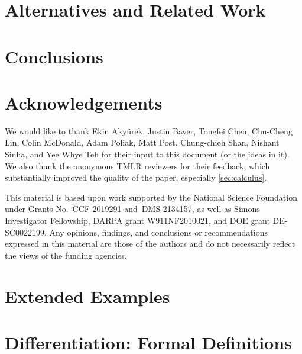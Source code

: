\documentclass[10pt]{article}
\theoremstyle{definition}
\begin{document}
\section{Alternatives and Related Work}


\section{Conclusions}


\section*{Acknowledgements}

We would like to thank Ekin Aky\"{u}rek, Justin Bayer, Tongfei Chen, Chu-Cheng Lin, Colin McDonald, Adam Poliak, Matt Post, Chung-chieh Shan, Nishant Sinha, and Yee Whye Teh for their input to this document (or the ideas in it). We also thank the anonymous TMLR reviewers for their feedback, which substantially improved the quality of the paper, especially \cref{sec:calculus}.

This material is based upon work supported by the National Science Foundation under Grants No.~CCF-2019291 and~DMS-2134157, as well as Simons Investigator Fellowship, DARPA grant W911NF2010021, and DOE grant DE-SC0022199. 
Any opinions, findings, and conclusions or recommendations expressed in this material are those of the authors and do not necessarily reflect the views of the funding agencies.




\appendix

\section{Extended Examples}
\label{sec:examples_long}


\section{Differentiation: Formal Definitions}
\label{sec:calculus_formal}



\end{document}
